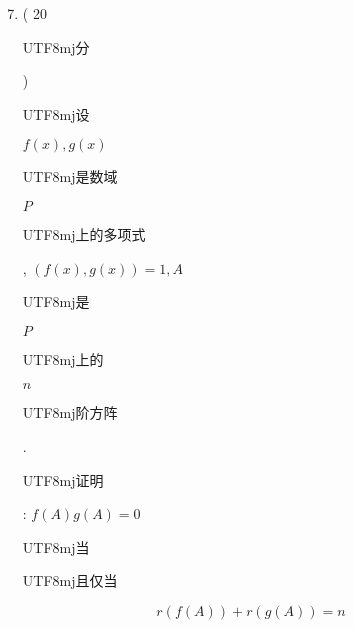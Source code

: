 \documentclass[10pt]{article}
\begin{document}
\begin{enumerate}
  \setcounter{enumi}{6}
  \item ( 20 \begin{CJK}{UTF8}{mj}分\end{CJK}) \begin{CJK}{UTF8}{mj}设\end{CJK} $f(x), g(x)$ \begin{CJK}{UTF8}{mj}是数域\end{CJK} $P$ \begin{CJK}{UTF8}{mj}上的多项式\end{CJK}, $(f(x), g(x))=1, A$ \begin{CJK}{UTF8}{mj}是\end{CJK} $P$ \begin{CJK}{UTF8}{mj}上的\end{CJK} $n$ \begin{CJK}{UTF8}{mj}阶方阵\end{CJK}. \begin{CJK}{UTF8}{mj}证明\end{CJK}: $f(A) g(A)=0$ \begin{CJK}{UTF8}{mj}当\end{CJK} \begin{CJK}{UTF8}{mj}且仅当\end{CJK}
\end{enumerate}
$$
r(f(A))+r(g(A))=n
$$
\end{document}
